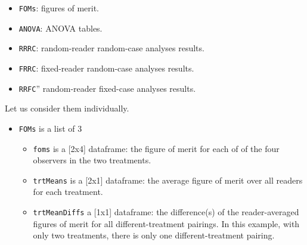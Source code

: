 \documentclass[
]{book}
\newenvironment{Shaded}{\begin{snugshade}}{\end{snugshade}}
\newcommand{\CommentTok}[1]{\textcolor[rgb]{0.56,0.35,0.01}{\textit{#1}}}
\newcommand{\FunctionTok}[1]{\textcolor[rgb]{0.00,0.00,0.00}{#1}}
\newcommand{\NormalTok}[1]{#1}
\newcommand{\SpecialCharTok}[1]{\textcolor[rgb]{0.00,0.00,0.00}{#1}}
\providecommand{\tightlist}{%
  \setlength{\itemsep}{0pt}\setlength{\parskip}{0pt}}
\begin{document}
\begin{itemize}
\tightlist
\item
  \texttt{FOMs}: figures of merit.
\item
  \texttt{ANOVA}: ANOVA tables.
\item
  \texttt{RRRC}: random-reader random-case analyses results.
\item
  \texttt{FRRC}: fixed-reader random-case analyses results.
\item
  \texttt{RRFC}'' random-reader fixed-case analyses results.
\end{itemize}

Let us consider them individually.

\begin{Shaded}
\end{Shaded}

\begin{itemize}
\tightlist
\item
  \texttt{FOMs} is a list of 3

  \begin{itemize}
  \tightlist
  \item
    \texttt{foms} is a {[}2x4{]} dataframe: the figure of merit for each of of the four observers in the two treatments.
  \item
    \texttt{trtMeans} is a {[}2x1{]} dataframe: the average figure of merit over all readers for each treatment.
  \item
    \texttt{trtMeanDiffs} a {[}1x1{]} dataframe: the difference(s) of the reader-averaged figures of merit for all different-treatment pairings. In this example, with only two treatments, there is only one different-treatment pairing.
  \end{itemize}
\end{itemize}
\end{document}
